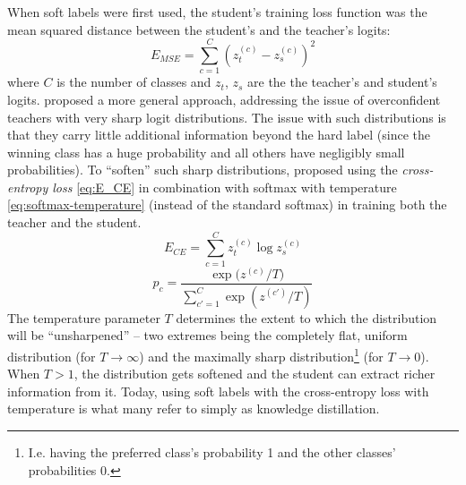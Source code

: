 \documentclass[bsc,frontabs,twoside,singlespacing,parskip,deptreport]{infthesis}
\begin{document}
{{{      When soft labels were first used, the student's training loss function was the mean squared distance between the student's and the teacher's logits:
      \begin{equation}
        E_{MSE}=\sum_{c=1}^{C}{(z_t^{(c)}-z_s^{(c)})^2}
        \label{eq:E_MSE}        
      \end{equation}
      where $C$ is the number of classes and $z_t$, $z_s$ are the the teacher's and student's logits.
      \citet{Hinton_2015} proposed a more general approach, addressing the issue of overconfident teachers with very sharp logit distributions. The issue with such distributions is that they carry little additional information beyond the hard label (since the winning class has a huge probability and all others have negligibly small probabilities).
      To ``soften'' such sharp distributions, \citeauthor{Hinton_2015} proposed using the \textit{cross-entropy loss} \autoref{eq:E_CE} in combination with softmax with temperature \autoref{eq:softmax-temperature} (instead of the standard softmax) in training both the teacher and the student.
      \begin{equation}
        E_{CE}=\sum_{c=1}^{C}{z_t^{(c)} \log{z_s^{(c)}}}
        \label{eq:E_CE}        
      \end{equation}
      \begin{equation}
        p_c=\frac{\exp{(z^{(c)}/T})}{\sum_{c'=1}^{C}{\exp{(z^{(c')}/T)}}}
        \label{eq:softmax-temperature}        
      \end{equation}
      The temperature parameter $T$ determines the extent to which the distribution will be ``unsharpened'' -- two extremes being the completely flat, uniform distribution (for $T \rightarrow \infty$) and the maximally sharp distribution\footnote{I.e. having the preferred class's probability 1 and the other classes' probabilities 0.} (for $T \rightarrow 0$). When $T > 1$, the distribution gets softened and the student can extract richer information from it. Today, using soft labels with the cross-entropy loss with temperature is what many refer to simply as knowledge distillation.

}}}
\end{document}
